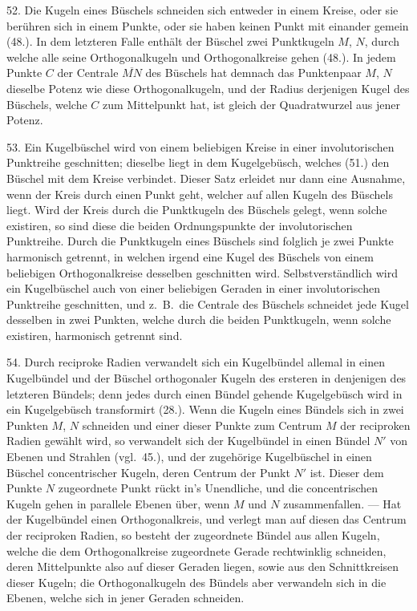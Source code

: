 52. Die Kugeln eines B\"uschels schneiden sich entweder
in einem Kreise, oder sie ber\"uhren sich in einem Punkte,
oder sie haben keinen Punkt mit einander gemein (48.). In
dem letzteren Falle enth\"alt der B\"uschel zwei Punktkugeln
$M$, $N$, durch welche alle seine Orthogonalkugeln und Orthogonalkreise
gehen (48.). In jedem Punkte $C$ der Centrale
$\overline{MN}$ des B\"uschels hat demnach das Punktenpaar $M$, $N$ dieselbe
Potenz wie diese Orthogonalkugeln, und der Radius
derjenigen Kugel des B\"uschels, welche $C$ zum Mittelpunkt
hat, ist gleich der Quadratwurzel aus jener Potenz.

53. Ein Kugelb\"uschel wird von einem beliebigen Kreise
in einer involutorischen Punktreihe geschnitten; dieselbe liegt
in dem Kugelgeb\"usch, welches (51.) den B\"uschel mit dem
Kreise verbindet. Dieser Satz erleidet nur dann eine Ausnahme,
wenn der Kreis durch einen Punkt geht, welcher auf
allen Kugeln des B\"uschels liegt. Wird der Kreis durch die
Punktkugeln des B\"uschels gelegt, wenn solche existiren, so
sind diese die beiden Ordnungspunkte der involutorischen
Punktreihe. Durch die Punktkugeln eines B\"uschels sind
folglich je zwei Punkte harmonisch getrennt, in welchen irgend
eine Kugel des B\"uschels von einem beliebigen Orthogonalkreise
desselben geschnitten wird. Selbstverst\"andlich
wird ein Kugelb\"uschel auch von einer beliebigen Geraden in
einer involutorischen Punktreihe geschnitten, und z.~B.\ die
Centrale des B\"uschels schneidet jede Kugel desselben in zwei
Punkten, welche durch die beiden Punktkugeln, wenn solche
existiren, harmonisch getrennt sind.

54. Durch reciproke Radien verwandelt sich ein Kugelb\"undel
allemal in einen Kugelb\"undel und der B\"uschel orthogonaler
Kugeln des ersteren in denjenigen des letzteren
B\"undels; denn jedes durch einen B\"undel gehende Kugelgeb\"usch
wird in ein Kugelgeb\"usch transformirt (28.). Wenn
die Kugeln eines B\"undels sich in zwei Punkten $M$, $N$ schneiden
und einer dieser Punkte zum Centrum $M$ der reciproken
Radien gew\"ahlt wird, so verwandelt sich der Kugelb\"undel
in einen B\"undel $N'$ von Ebenen und Strahlen (vgl.\ 45.),
und der zugeh\"orige Kugelb\"uschel in einen B\"uschel concentrischer
Kugeln, deren Centrum der Punkt $N'$ ist. Dieser
dem Punkte $N$ zugeordnete Punkt r\"uckt in's Unendliche, und
die concentrischen Kugeln gehen in parallele Ebenen \"uber,
wenn $M$ und $N$ zusammenfallen. --- Hat der Kugelb\"undel
einen Orthogonalkreis, und verlegt man auf diesen das Centrum
der reciproken Radien, so besteht der zugeordnete
B\"undel aus allen Kugeln, welche die dem Orthogonalkreise zugeordnete
Gerade rechtwinklig schneiden, deren Mittelpunkte
also auf dieser Geraden liegen, sowie aus den Schnittkreisen
dieser Kugeln; die Orthogonalkugeln des B\"undels aber verwandeln
sich in die Ebenen, welche sich in jener Geraden
schneiden.

